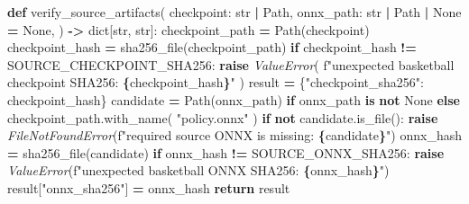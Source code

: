 \documentclass[
  american,
  11pt,
  letterpaper,
]{article}
\newenvironment{Shaded}{\begin{snugshade}}{\end{snugshade}}
\newcommand{\BuiltInTok}[1]{#1}
\newcommand{\ControlFlowTok}[1]{\textcolor[rgb]{0.13,0.29,0.53}{\textbf{#1}}}
\newcommand{\KeywordTok}[1]{\textcolor[rgb]{0.13,0.29,0.53}{\textbf{#1}}}
\newcommand{\NormalTok}[1]{#1}
\newcommand{\OperatorTok}[1]{\textcolor[rgb]{0.81,0.36,0.00}{\textbf{#1}}}
\newcommand{\PreprocessorTok}[1]{\textcolor[rgb]{0.56,0.35,0.01}{\textit{#1}}}
\newcommand{\SpecialCharTok}[1]{\textcolor[rgb]{0.81,0.36,0.00}{\textbf{#1}}}
\newcommand{\SpecialStringTok}[1]{\textcolor[rgb]{0.31,0.60,0.02}{#1}}
\newcommand{\StringTok}[1]{\textcolor[rgb]{0.31,0.60,0.02}{#1}}
\newcommand{\VariableTok}[1]{\textcolor[rgb]{0.00,0.00,0.00}{#1}}
\renewenvironment{Shaded}{\par\smallskip}{\par\smallskip}
\begin{document}
\begin{Shaded}
\begin{Highlighting}[]
\KeywordTok{def}\NormalTok{ verify\_source\_artifacts(}
\NormalTok{    checkpoint: }\BuiltInTok{str} \OperatorTok{|}\NormalTok{ Path,}
\NormalTok{    onnx\_path: }\BuiltInTok{str} \OperatorTok{|}\NormalTok{ Path }\OperatorTok{|} \VariableTok{None} \OperatorTok{=} \VariableTok{None}\NormalTok{,}
\NormalTok{) }\OperatorTok{{-}\textgreater{}} \BuiltInTok{dict}\NormalTok{[}\BuiltInTok{str}\NormalTok{, }\BuiltInTok{str}\NormalTok{]:}
\NormalTok{    checkpoint\_path }\OperatorTok{=}\NormalTok{ Path(checkpoint)}
\NormalTok{    checkpoint\_hash }\OperatorTok{=}\NormalTok{ sha256\_file(checkpoint\_path)}
    \ControlFlowTok{if}\NormalTok{ checkpoint\_hash }\OperatorTok{!=}\NormalTok{ SOURCE\_CHECKPOINT\_SHA256:}
        \ControlFlowTok{raise} \PreprocessorTok{ValueError}\NormalTok{(}
            \SpecialStringTok{f"unexpected basketball checkpoint SHA256: }\SpecialCharTok{\{}\NormalTok{checkpoint\_hash}\SpecialCharTok{\}}\SpecialStringTok{"}
\NormalTok{        )}
\NormalTok{    result }\OperatorTok{=}\NormalTok{ \{}\StringTok{"checkpoint\_sha256"}\NormalTok{: checkpoint\_hash\}}
\NormalTok{    candidate }\OperatorTok{=}\NormalTok{ Path(onnx\_path) }\ControlFlowTok{if}\NormalTok{ onnx\_path }\KeywordTok{is} \KeywordTok{not} \VariableTok{None} \ControlFlowTok{else}\NormalTok{ checkpoint\_path.with\_name(}
        \StringTok{"policy.onnx"}
\NormalTok{    )}
    \ControlFlowTok{if} \KeywordTok{not}\NormalTok{ candidate.is\_file():}
        \ControlFlowTok{raise} \PreprocessorTok{FileNotFoundError}\NormalTok{(}\SpecialStringTok{f"required source ONNX is missing: }\SpecialCharTok{\{}\NormalTok{candidate}\SpecialCharTok{\}}\SpecialStringTok{"}\NormalTok{)}
\NormalTok{    onnx\_hash }\OperatorTok{=}\NormalTok{ sha256\_file(candidate)}
    \ControlFlowTok{if}\NormalTok{ onnx\_hash }\OperatorTok{!=}\NormalTok{ SOURCE\_ONNX\_SHA256:}
        \ControlFlowTok{raise} \PreprocessorTok{ValueError}\NormalTok{(}\SpecialStringTok{f"unexpected basketball ONNX SHA256: }\SpecialCharTok{\{}\NormalTok{onnx\_hash}\SpecialCharTok{\}}\SpecialStringTok{"}\NormalTok{)}
\NormalTok{    result[}\StringTok{"onnx\_sha256"}\NormalTok{] }\OperatorTok{=}\NormalTok{ onnx\_hash}
    \ControlFlowTok{return}\NormalTok{ result}



\end{Highlighting}
\end{Shaded}
\end{document}

